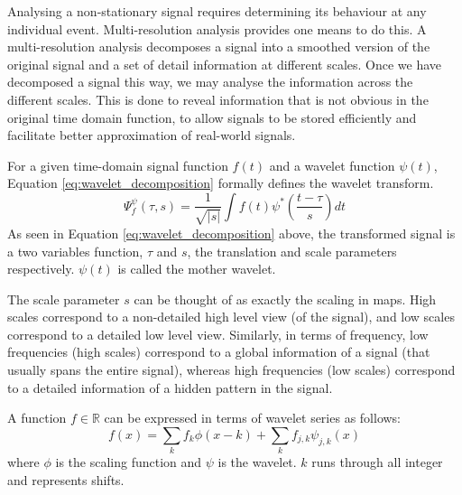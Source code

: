 Analysing a non-stationary signal requires determining its behaviour at any individual event. Multi-resolution analysis provides one means to do this. 
A multi-resolution analysis decomposes a signal into a smoothed version of the original signal and a set of detail information at different scales. 
Once we have decomposed a signal this way, we may analyse the information across the different scales. 
This is done to reveal information that is not obvious in the original time domain function, to allow signals to be stored efficiently and facilitate better approximation of real-world signals. 

For a given time-domain signal function $f(t)$ and a wavelet function $\psi(t)$, Equation \ref{eq:wavelet_decomposition} formally defines the wavelet transform.
\begin{equation}
\Psi^{\psi}_{f}(\tau, s)=\frac{1}{\sqrt{|s|}}\int{f(t)\psi^*(\frac{t-\tau}{s})dt}
\label{eq:wavelet_decomposition}
\end{equation}
As seen in Equation \ref{eq:wavelet_decomposition} above, the transformed signal is a two variables function, $\tau$ and $s$, the translation and scale parameters respectively. 
$\psi(t)$ is called the mother wavelet.

The scale parameter $s$ can be thought of as exactly the scaling in maps. 
High scales correspond to a non-detailed high level view (of the signal), and low scales correspond to a detailed low level view. Similarly, in terms of frequency, low frequencies (high scales) correspond to a global information of a signal (that usually spans the entire signal), whereas high frequencies (low scales) correspond to a detailed information of a hidden pattern in the signal.

A function $f \in \mathds{R}$ can be expressed in terms of wavelet series as follows:
\begin{equation}
f(x)=\sum\limits_{k}{f_k \phi(x-k)}+\sum\limits_{k}{f_{j,k}\psi_{j,k}(x)}
\end{equation}
where $\phi$ is the scaling function and $\psi$ is the wavelet. $k$ runs through all integer and represents shifts.

%
%
%
%
